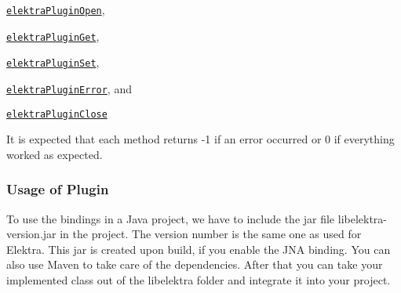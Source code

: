 \begin{DoxyItemize}
\item \href{https://doc.libelektra.org/api/current/html/group__plugin.html#ga23c2eb3584e38a4d494eb8f91e5e3d8d}{\tt {\ttfamily elektra\+Plugin\+Open}},
\item \href{https://doc.libelektra.org/api/current/html/group__plugin.html#gacb69f3441c6d84241b4362f958fbe313}{\tt {\ttfamily elektra\+Plugin\+Get}},
\item \href{https://doc.libelektra.org/api/current/html/group__plugin.html#gae65781a1deb34efc79c8cb9d9174842c}{\tt {\ttfamily elektra\+Plugin\+Set}},
\item \href{https://doc.libelektra.org/api/current/html/group__plugin.html#gad74b35f558ac7c3262f6069c5c47dc79}{\tt {\ttfamily elektra\+Plugin\+Error}}, and
\item \href{https://doc.libelektra.org/api/current/html/group__plugin.html#ga1236aefe5b2baf8b7bf636ba5aa9ea29}{\tt {\ttfamily elektra\+Plugin\+Close}}
\end{DoxyItemize}

It is expected that each method returns -\/1 if an error occurred or 0 if everything worked as expected.

\subsubsection*{Usage of Plugin}

To use the bindings in a Java project, we have to include the jar file {\ttfamily libelektra-\/version.\+jar} in the project. The version number is the same one as used for Elektra. This jar is created upon build, if you enable the J\+NA binding. You can also use Maven to take care of the dependencies. After that you can take your implemented class out of the {\ttfamily libelektra} folder and integrate it into your project. 